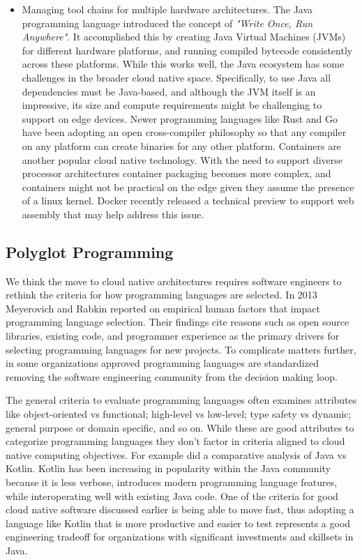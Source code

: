 \documentclass[conference]{IEEEconf}
\begin{document}
\begin{itemize}
	\item Managing tool chains for multiple hardware architectures.  The Java programming language introduced the concept of \textit{"Write Once, Run Anywhere"}. It accomplished this by creating Java Virtual Machines (JVMs) for different hardware platforms, and running compiled bytecode consistently across these platforms.  While this works well, the Java ecosystem has some challenges in the broader cloud native space.  Specifically, to use Java all dependencies must be Java-based, and although the JVM itself is an impressive, its size and compute requirements might be challenging to support on edge devices. Newer programming languages like Rust and Go have been adopting an open cross-compiler philosophy so that any compiler on any platform can create binaries for any other platform.  Containers are another popular cloud native technology.  With the need to support diverse processor architectures container packaging becomes more complex, and containers might not be practical on the edge given they assume the presence of a linux kernel.  Docker recently released a technical preview to support web assembly that may help address this issue\cite{DockerWASM}.
\end{itemize}
 
\subsection{Polyglot Programming}
We think the move to cloud native architectures requires software engineers to rethink the criteria for how programming languages are selected.  In 2013 Meyerovich and Rabkin\cite{meyerovich2013empirical} reported on empirical human factors that impact programming language selection.  Their findings cite reasons such as open source libraries, existing code, and programmer experience as the primary drivers for selecting programming languages for new projects. To complicate matters further, in some organizations approved programming languages are standardized removing the software engineering community from the decision making loop.

The general criteria to evaluate programming languages often examines attributes like object-oriented vs functional; high-level vs low-level; type safety vs dynamic; general purpose or domain specific, and so on.  While these are good attributes to categorize programming languages they don't factor in criteria aligned to cloud native computing objectives.  For example\cite{flauzino2018you} did a comparative analysis of Java vs Kotlin.  Kotlin has been increasing in popularity within the Java community because it is less verbose, introduces modern programming language features, while interoperating well with existing Java code.  One of the criteria for good cloud native software discussed earlier is being able to move fast, thus adopting a language like Kotlin that is more productive and easier to test represents a good engineering tradeoff for organizations with significant investments and skillsets in Java. 
\end{document}
